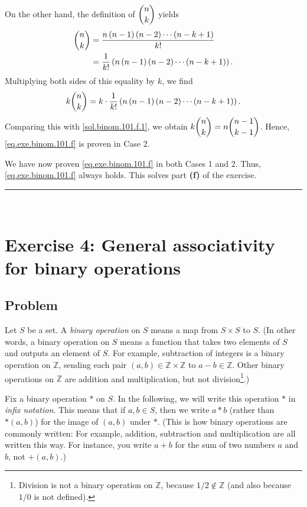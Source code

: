 \documentclass[paper=a4, fontsize=12pt]{scrartcl} %
\newcommand{\ZZ}{\mathbb{Z}} %
\newcommand{\tup}[1]{\left( #1 \right)}
\newcommand{\horrule}[1]{\rule{\linewidth}{#1}} %
\theoremstyle{plainsl}
\theoremstyle{definition}
\theoremstyle{remark}
\begin{document}
On the other hand, the definition of $\dbinom{n}{k}$ yields
\begin{align}
\dbinom{n}{k}
&= \dfrac{n \tup{n-1} \tup{n-2} \cdots \tup{n-k+1}}{k!} \nonumber \\
&= \dfrac{1}{k!} \tup{n \tup{n-1} \tup{n-2} \cdots \tup{n-k+1}} .
\end{align}
Multiplying both sides of this equality by $k$, we find
\[
k \dbinom{n}{k}
= k \cdot \dfrac{1}{k!} \tup{n \tup{n-1} \tup{n-2} \cdots \tup{n-k+1}} .
\]
Comparing this with \eqref{sol.binom.101.f.1},
we obtain $k \dbinom{n}{k} = n \dbinom{n-1}{k-1}$.
Hence, \eqref{eq.exe.binom.101.f} is proven in Case 2.

We have now proven \eqref{eq.exe.binom.101.f} in both
Cases 1 and 2. Thus, \eqref{eq.exe.binom.101.f} always holds.
This solves part \textbf{(f)} of the exercise.

\horrule{0.3pt} \\[0.4cm]

\section{Exercise 4: General associativity for binary operations}

\subsection{Problem}

Let $S$ be a set.
A \textit{binary operation} on $S$ means a map from $S \times S$
to $S$.
(In other words, a binary operation on $S$ means a function that
takes two elements of $S$ and outputs an element of $S$.
For example, subtraction of integers is a binary operation on $\ZZ$,
sending each pair $\tup{a, b} \in \ZZ \times \ZZ$ to $a-b \in \ZZ$.
Other binary operations on $\ZZ$ are addition and multiplication,
but not division\footnote{Division is not a binary operation on $\ZZ$,
because $1 / 2 \notin \ZZ$ (and also because $1 / 0$ is not
defined).}.)

Fix a binary operation $*$ on $S$.
In the following, we will write this operation $*$ in
\textit{infix notation}. This means that if $a, b \in S$, then
we write $a * b$ (rather than $* \tup{a, b}$) for
the image of $\tup{a, b}$ under $*$.
(This is how binary operations are commonly written: For example,
addition, subtraction and multiplication are all written
this way.
For instance, you write $a + b$ for the sum of two numbers
$a$ and $b$, not $+ \tup{a, b}$.)
\end{document}
